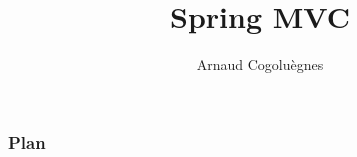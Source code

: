 \documentclass{beamer}
\title{Spring MVC}
\author{Arnaud Cogoluègnes}
\institute{Zenika}
\begin{document}
\begin{frame}
\titlepage
\end{frame}

\begin{frame}
 \frametitle{Plan}
 \scriptsize{\tableofcontents}
\end{frame}







\end{document}

